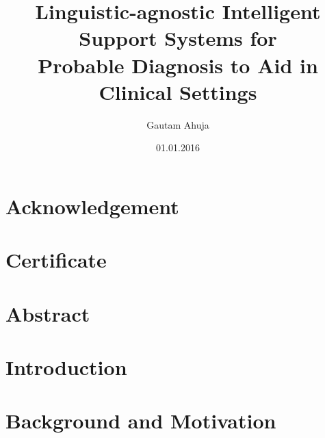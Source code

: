 \documentclass[%
]{tumDiss}
\title{%
  Linguistic-agnostic Intelligent Support Systems for\\
   Probable Diagnosis to Aid in Clinical Settings\\
}
\author{Gautam Ahuja}
\date{01.01.2016}
\begin{document}
\frontmatter
\maketitle


\chapter{Acknowledgement}
\lipsum[1]


\chapter{Certificate}
\lipsum[1]



\chapter{Abstract}








\tableofcontents
\listoffigures
\listoftables
\printglossary[type=\acronymtype, nonumberlist]



\mainmatter
\chapter{Introduction}
\label{chap:introduction}

\lipsum[1-4]


\chapter{Background and Motivation}
\label{chap:bcgmot}
\lipsum[1-4]
\end{document}
